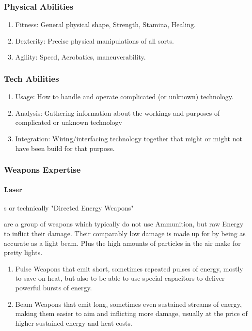     \subsubsection{Physical Abilities} 
        \begin{enumerate}[label= -]
            \item {Fitness}: General physical shape, Strength, Stamina, Healing.
            \item {Dexterity}: Precise physical manipulations of all sorts.
            \item {Agility}: Speed, Acrobatics, maneuverability.
        \end{enumerate}
    \subsubsection{Tech Abilities}
        \begin{enumerate}[label= -]
            \item {Usage}: How to handle and operate complicated (or unknown) technology.
            \item {Analysis}: Gathering information about the workings and purposes of complicated or unknown technology
            \item {Integration}: Wiring/interfacing technology together that might or might not have been build for
            that purpose.
        \end{enumerate}
        \subsubsection{Weapons Expertise}
        \paragraph{Laser}s or technically "Directed Energy Weapons" \par are a group of weapons which typically
    do not use Ammunition, but raw Energy to inflict their damage.
    Their comparably low damage is made up for by being
    as accurate as a light beam.
    Plus the high amounts of particles in the air make for pretty lights.
        \begin{enumerate}[label= -]
            \item {Pulse} Weapons that emit short, sometimes repeated pulses of energy, mostly to save on heat, but also
            to be able to use special capacitors to deliver powerful bursts of energy.
            \item {Beam} Weapons that emit long, sometimes even sustained streams of energy, making them easier to aim
            and inflicting more damage, usually at the price of higher sustained energy and heat costs.
        \end{enumerate}
